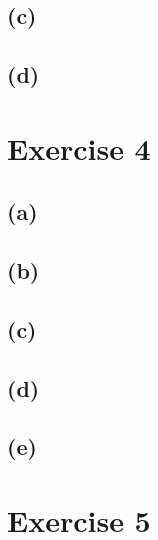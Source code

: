 \documentclass[12pt]{article}
\begin{document}
\subsection*{(c)}
\subsection*{(d)}

\section*{Exercise 4}
\subsection*{(a)}
\subsection*{(b)}
\subsection*{(c)}
\subsection*{(d)}
\subsection*{(e)}

\section*{Exercise 5}
\end{document}
